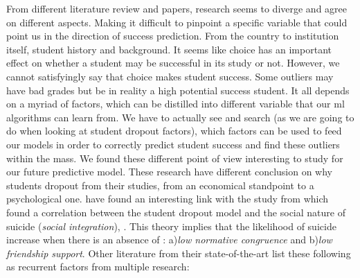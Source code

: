 \documentclass[../../main.tex]{subfiles}
\begin{document}
From different literature review and papers, research seems to diverge and agree on different aspects. Making it difficult to pinpoint a specific variable that could point us in the direction of success prediction. From the country to institution itself, student history and background. It seems like choice has an important effect on whether a student may be successful in its study or not. However, we cannot satisfyingly say that choice makes student success.  Some outliers may have bad grades but be in reality a high potential success student. It all depends on a myriad of factors, which can be distilled into different variable that our \acrfull{ml} algorithms can learn from. We have to actually see and search (as we are going to do when looking at student dropout factors), which factors can be used to feed our models in order to correctly predict student success and find these outliers within the mass.\cite{kuh_what_2006, sa_how_2018}
We found these different point of view interesting to study for our future predictive model. These research have different conclusion on why students dropout from their studies, from an economical standpoint to a psychological one.\cite{opazo_analysis_2021} have found an interesting link with the study from\cite{spady_dropouts_1970} which found a correlation between the student dropout model and the social nature of suicide (\textit{social integration}), \cite{durkheim_suicide_1951}. This theory implies that the likelihood of suicide increase when there is an absence of : a)\textit{low normative congruence} and b)\textit{low friendship support}. Other literature from their state-of-the-art list these following as recurrent factors from multiple research\cite{opazo_analysis_2021,tinto_dropout_1975,caspersen_teachers_2015,lidia_problema_2006,bejarano_caso_2017,sinchi_acceso_2018,cavero_voluntad_2011,velasco_alisis_nodate}: 
\end{document}

